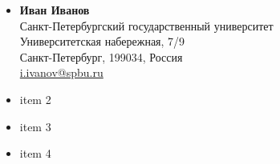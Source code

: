 \begin{multicols}{2}
\begin{itemize}
        \item \textbf{Иван Иванов} \\
              Санкт-Петербургский государственный университет \\
              Университетская набережная, 7/9 \\
              Санкт-Петербург, 199034, Россия \\
              \url{i.ivanov@spbu.ru}

              
        \item item 2
        \item item 3
        \item item 4
    \end{itemize}
\end{multicols}

